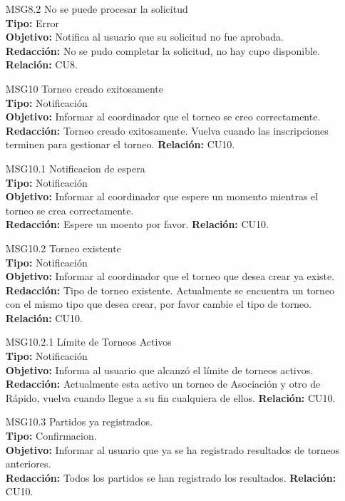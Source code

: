 \begin{itemize}
	 \item[MSG8.2] No se puede procesar la solicitud\\
	 \textbf{Tipo:} Error\\
	 \textbf{Objetivo:} Notifica al usuario que su solicitud no fue aprobada.\\
	 \textbf{Redacción:} No se pudo completar la solicitud, no hay cupo disponible.
	 \textbf{Relación:} CU8.
	 
	  \item[MSG10] Torneo creado exitosamente\\
	 \textbf{Tipo:} Notificación\\
	 \textbf{Objetivo:} Informar al coordinador que el torneo se creo correctamente.\\
	 \textbf{Redacción:} Torneo creado exitosamente. Vuelva cuando las inscripciones terminen para gestionar el torneo.
	 \textbf{Relación:} CU10.
	 
	 \item[MSG10.1] Notificacion de espera\\
	 \textbf{Tipo:} Notificación\\
	 \textbf{Objetivo:} Informar al coordinador que espere un momento mientras el torneo se crea correctamente.\\
	 \textbf{Redacción:} Espere un moento por favor.
	 \textbf{Relación:} CU10.
	 
	 \item[MSG10.2] Torneo existente\\
	 \textbf{Tipo:} Notificación\\
	 \textbf{Objetivo:} Informar al coordinador que el torneo que desea crear ya existe.\\
	 \textbf{Redacción:} Tipo de torneo existente. Actualmente se encuentra un torneo con el mismo tipo que desea crear, por favor cambie el tipo de torneo.
	 \textbf{Relación:} CU10.
	 
	  \item[MSG10.2.1] Límite de Torneos Activos\\
	 \textbf{Tipo:} Notificación\\
	 \textbf{Objetivo:} Informa al usuario que alcanzó el límite de torneos activos.\\
	 \textbf{Redacción:} Actualmente esta activo un torneo de Asociación y otro de Rápido, vuelva cuando llegue a su fin cualquiera de ellos.
	 \textbf{Relación:} CU10.
	 
	 \item[MSG10.3] Partidos ya registrados.\\
	 \textbf{Tipo:} Confirmacion.\\
	 \textbf{Objetivo:} Informar al usuario que ya se ha registrado resultados de torneos anteriores.\\
	 \textbf{Redacción:} Todos los partidos se han registrado los resultados.
	 \textbf{Relación:} CU10.
	 

\end{itemize}
